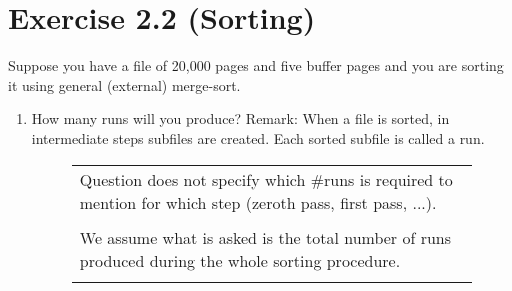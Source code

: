 \documentclass[10pt]{article}
\begin{document}
	\clearpage
	
	
	\section*{Exercise 2.2 (Sorting)}
		Suppose you have a file of 20,000 pages and five buffer pages and you are sorting it using general (external) merge-sort.
		
		\begin{enumerate}
			\item How many runs will you produce? Remark: When a file is sorted, in intermediate steps subfiles are created. Each sorted subfile is called a run. \\
			
			
			
			
			\begin{figure}[!htb]
				\centering
				\begin{minipage}[t]{0.4\textwidth}
					\begin{tabular}{p{\textwidth}}
						Question does not specify which \#runs is required to mention for which step (zeroth pass, first pass, ...).\\
						
						\\
						
						We assume what is asked is the total number of runs produced during the whole sorting procedure.\\
						
						\\
						

\end{tabular}
\end{minipage}
\end{figure}
\end{enumerate}
\end{document}
